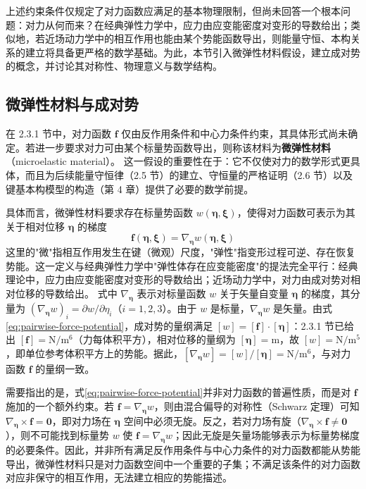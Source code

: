 上述约束条件仅规定了对力函数应满足的基本物理限制，但尚未回答一个根本问题：对力从何而来？在经典弹性力学中，应力由应变能密度对变形的导数给出；类似地，若近场动力学中的相互作用也能由某个势能函数导出，则能量守恒、本构关系的建立将具备更严格的数学基础。为此，本节引入微弹性材料假设，建立成对势的概念，并讨论其对称性、物理意义与数学结构。

\subsection{微弹性材料与成对势}

在 2.3.1 节中，对力函数 $\mathbf{f}$ 仅由反作用条件和中心力条件约束，其具体形式尚未确定。若进一步要求对力可由某个标量势函数导出，则称该材料为\textbf{微弹性材料}（microelastic material）\cite{Silling2000}。
这一假设的重要性在于：它不仅使对力的数学形式更具体，而且为后续能量守恒律（2.5 节）的建立、守恒量的严格证明（2.6 节）以及键基本构模型的构造（第 4 章）提供了必要的数学前提。

具体而言，微弹性材料要求存在标量势函数 $w(\boldsymbol{\eta},\boldsymbol{\xi})$，使得对力函数可表示为其关于相对位移 $\boldsymbol{\eta}$ 的梯度
\begin{equation}
  \mathbf{f}(\boldsymbol{\eta},\boldsymbol{\xi})=\nabla_{\boldsymbol{\eta}} w(\boldsymbol{\eta},\boldsymbol{\xi})
  \label{eq:pairwise-force-potential}
\end{equation}
这里的"微"指相互作用发生在键（微观）尺度，"弹性"指变形过程可逆、存在恢复势能。这一定义与经典弹性力学中"弹性体存在应变能密度"的提法完全平行：经典理论中，应力由应变能密度对变形的导数给出；近场动力学中，对力由成对势对相对位移的导数给出。
式中 $\nabla_{\boldsymbol{\eta}}$ 表示对标量函数 $w$ 关于矢量自变量 $\boldsymbol{\eta}$ 的梯度，其分量为 $(\nabla_{\boldsymbol{\eta}} w)_i = \partial w / \partial \eta_i$（$i=1,2,3$）。由于 $w$ 是标量，$\nabla_{\boldsymbol{\eta}} w$ 是矢量。由式\eqref{eq:pairwise-force-potential}，成对势的量纲满足 $[w]=[\mathbf{f}]\cdot[\boldsymbol{\eta}]$：2.3.1 节已给出 $[\mathbf{f}]=\mathrm{N}/\mathrm{m}^6$（力每体积平方），相对位移的量纲为 $[\boldsymbol{\eta}]=\mathrm{m}$，故 $[w]=\mathrm{N}/\mathrm{m}^5$，即单位参考体积平方上的势能。据此，$[\nabla_{\boldsymbol{\eta}} w]=[w]/[\boldsymbol{\eta}]=\mathrm{N}/\mathrm{m}^6$，与对力函数 $\mathbf{f}$ 的量纲一致。

需要指出的是，式\eqref{eq:pairwise-force-potential}并非对力函数的普遍性质，而是对 $\mathbf{f}$ 施加的一个额外约束。若 $\mathbf{f}=\nabla_{\boldsymbol{\eta}}w$，则由混合偏导的对称性（Schwarz 定理）可知 $\nabla_{\boldsymbol{\eta}}\times\mathbf{f}=\mathbf{0}$，即对力场在 $\boldsymbol{\eta}$ 空间中必须无旋。反之，若对力场有旋（$\nabla_{\boldsymbol{\eta}}\times\mathbf{f}\neq\mathbf{0}$），则不可能找到标量势 $w$ 使 $\mathbf{f}=\nabla_{\boldsymbol{\eta}}w$；因此无旋是矢量场能够表示为标量势梯度的必要条件。因此，并非所有满足反作用条件与中心力条件的对力函数都能从势能导出，微弹性材料只是对力函数空间中一个重要的子集；不满足该条件的对力函数对应非保守的相互作用，无法建立相应的势能描述。

